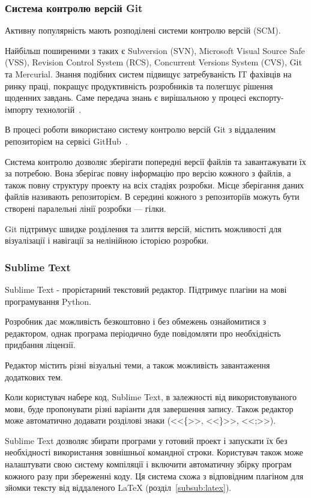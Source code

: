\subsubsection{Система контролю версій Git}

Активну популярність мають розподілені системи контролю версій (SCM).

Найбільш поширеними з таких є Subversion (SVN), Microsoft Visual Source Safe (VSS), Revision Control System (RCS), Concurrent Versions System (CVS), Gіt та Mercurіal. Знання подібних систем підвищує затребуваність ІT фахівців на ринку праці, покращує продуктивність розробників та полегшує рішення щоденних завдань. Саме передача знань є вирішальною у процесі експорту-імпорту технологій~\cite{киричек2012модель}.

В процесі роботи використано систему контролю версій Git з віддаленим репозиторієм на сервісі GitHub~\cite{gCalShedule}.

Система контролю дозволяє зберігати попередні версії файлів та завантажувати їх за потребою. Вона зберігає повну інформацію про версію кожного з файлів, а також повну структуру проекту на всіх стадіях розробки. Місце зберігання даних файлів називають репозиторієм. В середині кожного з репозиторіїв можуть бути створені паралельні лінії розробки — гілки.

Git підтримує швидке розділення та злиття версій, містить можливості для візуалізації і навігації за нелінійною історією розробки. 

\subsubsection{Sublime Text}

Sublime Text - прорієтарний текстовий редактор. Підтримує плагіни на мові програмування Python.

Розробник дає можливість безкоштовно і без обмежень ознайомитися з редактором, однак програма періодично буде повідомляти про необхідність придбання ліцензії.

Редактор містить різні візуальні теми, а також можливість завантаження додаткових тем.

Коли користувач набере код, Sublime Text, в залежності від використовуваного мови, буде пропонувати різні варіанти для завершення запису. Також редактор може автоматично додавати розділові знаки (<<\{>>, <<\}>>, <<;>>).

Sublime Text дозволяє збирати програми у готовий проект і запускати їх без необхідності використання зовнішньої командної строки. Користувач також може налаштувати свою систему компіляції і включити автоматичну збірку програм кожного разу при збереженні коду. Ця система схожа з відповідним плагіном для зйомки тексту від віддаленого LaTeX (розділ~\ref{subsub:latex}).

